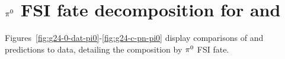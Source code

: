  

\section*{$\pi^0$ FSI fate decomposition for \gZero and \gC}\label{sec:appfate}

Figures~\ref{fig:g24-0-dat-pi0}-\ref{fig:g24-c-pn-pi0} display comparisons of  \gZero and \gC predictions to data, detailing the composition by $\pi^0$ FSI fate.


